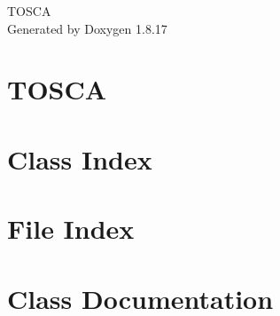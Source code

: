 \let\mypdfximage\pdfximage\def\pdfximage{\immediate\mypdfximage}\documentclass[twoside]{book}
\newcommand{\+}{\discretionary{\mbox{\scriptsize$\hookleftarrow$}}{}{}}
\newcommand{\clearemptydoublepage}{%
  \newpage{\pagestyle{empty}\cleardoublepage}%
}
\begin{document}
\hypersetup{pageanchor=false,
             bookmarksnumbered=true,
             pdfencoding=unicode
            }
\begin{titlepage}
\vspace*{7cm}
\begin{center}%
{\Large T\+O\+S\+CA }\\
\vspace*{1cm}
{\large Generated by Doxygen 1.8.17}\\
\end{center}
\end{titlepage}
\clearemptydoublepage
{}
\tableofcontents
\clearemptydoublepage
{}
\hypersetup{pageanchor=true}

\chapter{T\+O\+S\+CA}
\label{index}\hypertarget{index}{}
\chapter{Class Index}

\chapter{File Index}

\chapter{Class Documentation}
























































\end{document}
